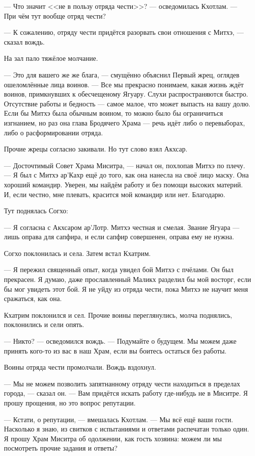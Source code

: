 --- Что значит <<не в пользу отряда чести>>? --- осведомилась Кхотлам.
--- При чём тут вообще отряд чести?

--- К сожалению, отряду чести придётся разорвать свои отношения с Митхэ, --- сказал вождь.

На зал пало тяжёлое молчание.

--- Это для вашего же же блага, --- смущённо объяснил Первый жрец, оглядев ошеломлённые лица воинов.
--- Все мы прекрасно понимаем, какая жизнь ждёт воинов, примкнувших к обесчещеному Ягуару.
Слухи распространяются быстро.
Отсутствие работы и бедность --- самое малое, что может выпасть на вашу долю.
Если бы Митхэ была обычным воином, то можно было бы ограничиться изгнанием, но раз она глава Бродячего Храма --- речь идёт либо о перевыборах, либо о расформировании отряда.

Прочие жрецы согласно закивали.
Но тут слово взял Акхсар.

--- Досточтимый Совет Храма Миситра, --- начал он, похлопав Митхэ по плечу.
--- Я был с Митхэ ар'Кахр ещё до того, как она нанесла на своё лицо маску.
Она хороший командир.
Уверен, мы найдём работу и без помощи высоких материй.
И, если честно, мне плевать, красится мой командир или нет.
Благодарю.

Тут поднялась Согхо:

--- Я согласна с Акхсаром ар'Лотр.
Митхэ честная и смелая.
Звание Ягуара --- лишь оправа для сапфира, и если сапфир совершенен, оправа ему не нужна.

Согхо поклонилась и села.
Затем встал Кхатрим.

--- Я пережил священный опыт, когда увидел бой Митхэ с пчёлами.
Он был прекрасен.
Я думаю, даже прославленный Маликх разделил бы мой восторг, если бы мог увидеть этот бой.
Я не уйду из отряда чести, пока Митхэ не научит меня сражаться, как она.

Кхатрим поклонился и сел.
Прочие воины переглянулись, молча поднялись, поклонились и сели опять.

--- Никто? --- осведомился вождь.
--- Подумайте о будущем.
Мы можем даже принять кого-то из вас в наш Храм, если вы боитесь остаться без работы.

Воины отряда чести промолчали.
Вождь вздохнул.

--- Мы не можем позволить запятнанному отряду чести находиться в пределах города, --- сказал он.
--- Вам придётся искать работу где-нибудь не в Миситре.
Я прошу прощения, но это вопрос репутации.

--- Кстати, о репутации, --- вмешалась Кхотлам.
--- Мы всё ещё ваши гости.
Насколько я знаю, из свитков с испытаниями и ответами распечатан только один.
Я прошу Храм Миситра об одолжении, как гость хозяина: можем ли мы посмотреть прочие задания и ответы?

